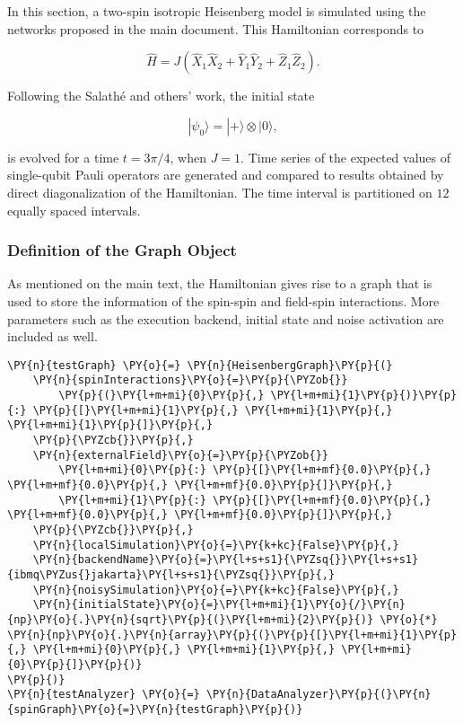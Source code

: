 In this section, a two-spin isotropic Heisenberg model is simulated
using the networks proposed in the main document. This Hamiltonian
corresponds to

\[
\hat{H} = J(\hat{X}_1\hat{X}_2 + \hat{Y}_1\hat{Y}_2 + \hat{Z}_1\hat{Z}_2).
\]

Following the Salathé and others' work, the initial state

\[
|\psi_0\rangle = |+\rangle\otimes|0\rangle,
\]

\noindent is evolved for a time \(t=3 \pi /4\), when \(J = 1\). Time series of the
expected values of single-qubit Pauli operators are generated and
compared to results obtained by direct diagonalization of the
Hamiltonian. The time interval is partitioned on \(12\) equally spaced
intervals.

    \hypertarget{definition-of-the-graph-object}{%
\subsubsection{Definition of the Graph
Object}\label{definition-of-the-graph-object}}

As mentioned on the main text, the Hamiltonian gives rise to a graph
that is used to store the information of the spin-spin and field-spin
interactions. More parameters such as the execution backend, initial
state and noise activation are included as well.

    \begin{tcolorbox}[breakable, size=fbox, boxrule=1pt, pad at break*=1mm,colback=cellbackground, colframe=cellborder]
\begin{Verbatim}[commandchars=\\\{\}]
\PY{n}{testGraph} \PY{o}{=} \PY{n}{HeisenbergGraph}\PY{p}{(}
    \PY{n}{spinInteractions}\PY{o}{=}\PY{p}{\PYZob{}}
        \PY{p}{(}\PY{l+m+mi}{0}\PY{p}{,} \PY{l+m+mi}{1}\PY{p}{)}\PY{p}{:} \PY{p}{[}\PY{l+m+mi}{1}\PY{p}{,} \PY{l+m+mi}{1}\PY{p}{,} \PY{l+m+mi}{1}\PY{p}{]}\PY{p}{,}
    \PY{p}{\PYZcb{}}\PY{p}{,}
    \PY{n}{externalField}\PY{o}{=}\PY{p}{\PYZob{}}
        \PY{l+m+mi}{0}\PY{p}{:} \PY{p}{[}\PY{l+m+mf}{0.0}\PY{p}{,} \PY{l+m+mf}{0.0}\PY{p}{,} \PY{l+m+mf}{0.0}\PY{p}{]}\PY{p}{,}
        \PY{l+m+mi}{1}\PY{p}{:} \PY{p}{[}\PY{l+m+mf}{0.0}\PY{p}{,} \PY{l+m+mf}{0.0}\PY{p}{,} \PY{l+m+mf}{0.0}\PY{p}{]}\PY{p}{,}
    \PY{p}{\PYZcb{}}\PY{p}{,}
    \PY{n}{localSimulation}\PY{o}{=}\PY{k+kc}{False}\PY{p}{,}
    \PY{n}{backendName}\PY{o}{=}\PY{l+s+s1}{\PYZsq{}}\PY{l+s+s1}{ibmq\PYZus{}jakarta}\PY{l+s+s1}{\PYZsq{}}\PY{p}{,}
    \PY{n}{noisySimulation}\PY{o}{=}\PY{k+kc}{False}\PY{p}{,}
    \PY{n}{initialState}\PY{o}{=}\PY{l+m+mi}{1}\PY{o}{/}\PY{n}{np}\PY{o}{.}\PY{n}{sqrt}\PY{p}{(}\PY{l+m+mi}{2}\PY{p}{)} \PY{o}{*} \PY{n}{np}\PY{o}{.}\PY{n}{array}\PY{p}{(}\PY{p}{[}\PY{l+m+mi}{1}\PY{p}{,} \PY{l+m+mi}{0}\PY{p}{,} \PY{l+m+mi}{1}\PY{p}{,} \PY{l+m+mi}{0}\PY{p}{]}\PY{p}{)}
\PY{p}{)}
\PY{n}{testAnalyzer} \PY{o}{=} \PY{n}{DataAnalyzer}\PY{p}{(}\PY{n}{spinGraph}\PY{o}{=}\PY{n}{testGraph}\PY{p}{)}
\end{Verbatim}
\end{tcolorbox}


